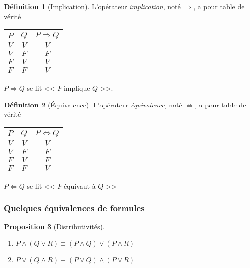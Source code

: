 \documentclass[11pt]{article}
\theoremstyle{definition}
\newtheorem{defn}{Définition}[section]
\newtheorem{prop}[defn]{Proposition}
\theoremstyle{remark}
\begin{document}
\begin{defn}[Implication]
L'opérateur \textit{implication}, noté $\Rightarrow$, a pour table de vérité

\begin{table}[ht]
\centering
\begin{tabular}{|c|c|c|}\hline
$P$ & $Q$ & $P\Rightarrow Q$ \\ \hline
$V$ & $V$ & $V$ \\\hline
$V$ & $F$ & $F$ \\\hline
$F$ & $V$ & $V$ \\\hline
$F$ & $F$ & $V$ \\\hline
\end{tabular}
\end{table}

$P\Rightarrow Q$ se lit << $P$ implique $Q$ >>.
\end{defn}

\begin{defn}[Équivalence]
L'opérateur \textit{équivalence}, noté $\Leftrightarrow$, a pour table de vérité

\begin{table}[ht]
\centering
\begin{tabular}{|c|c|c|}\hline
$P$ & $Q$ & $P\Leftrightarrow Q$ \\ \hline
$V$ & $V$ & $V$ \\\hline
$V$ & $F$ & $F$ \\\hline
$F$ & $V$ & $F$ \\\hline
$F$ & $F$ & $V$ \\\hline
\end{tabular}
\end{table}

$P\Leftrightarrow Q$ se lit << $P$ équivaut à $Q$ >>
\end{defn}

\subsubsection{Quelques équivalences de formules}

\begin{prop}[Distributivités]\leavevmode
\begin{enumerate}
\item $P\land (Q\lor R) \equiv(P\land Q)\lor (P\land R)$
\item $P\lor(Q\land R)\equiv (P\lor Q)\land (P\lor R)$
\end{enumerate}

\end{prop}
\end{document}
